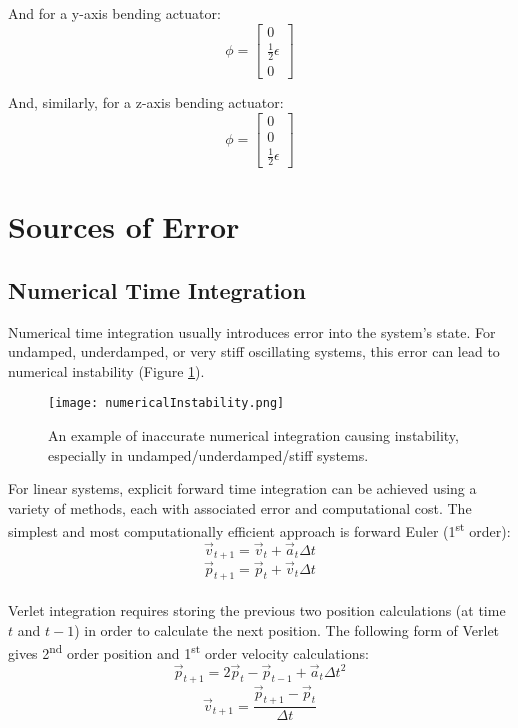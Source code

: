 {And for a y-axis bending actuator:
\[ \phi = \left[ \begin{array}{ccc}
0\\
\tfrac{1}{2}\epsilon\\
0
 \end{array} \right]
\]

And, similarly, for a z-axis bending actuator:
\[ \phi = \left[ \begin{array}{ccc}
0\\
0\\
\tfrac{1}{2}\epsilon
 \end{array} \right]
\]

\section{Sources of Error}

\subsection{Numerical Time Integration}

Numerical time integration usually introduces error into the system's state.  For undamped, underdamped, or very stiff oscillating systems, this error can lead to numerical instability (Figure \ref{fig:numericalInstability}).\\

\begin{figure}
  \texttt{[image: numericalInstability.png]}
  \caption{An example of inaccurate numerical integration causing instability, especially in undamped/underdamped/stiff systems.}
  \label{fig:numericalInstability}
\end{figure}

For linear systems, explicit forward time integration can be achieved using a variety of methods, each with associated error and computational cost.  The simplest and most computationally efficient approach is forward Euler (1\textsuperscript{st} order):
\[ \vec{v}_{t+1} = \vec{v}_{t} +  \vec{a}_{t}\Delta t\]
\[ \vec{p}_{t+1} = \vec{p}_{t} +  \vec{v}_{t}\Delta t\]\\

Verlet integration requires storing the previous two position calculations (at time $t$ and $t-1$) in order to calculate the next position.  The following form of Verlet gives 2\textsuperscript{nd} order position and 1\textsuperscript{st} order velocity calculations:
\[ \vec{p}_{t+1} = 2\vec{p}_{t} - \vec{p}_{t-1} +  \vec{a}_{t}\Delta t^2\]
\[ \vec{v}_{t+1} = \dfrac{\vec{p}_{t+1} - \vec{p}_{t}}{\Delta t}\]\\

}
